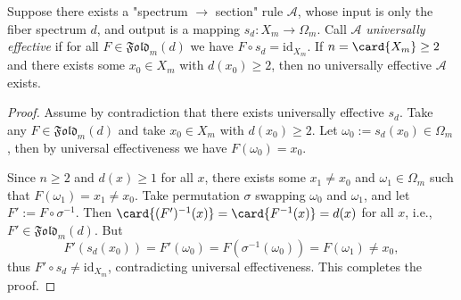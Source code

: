 \begin{theorem}\label{thm:pom-spectrum-cannot-induce-universal-section}
Suppose there exists a "spectrum \(\to\) section" rule \(\mathcal{A}\), whose input is only the fiber spectrum \(d\), and output is a mapping \(s_d:X_m\to\Omega_m\).
Call \(\mathcal{A}\) \emph{universally effective} if for all \(F\in\mathfrak{Fold}_m(d)\) we have \(F\circ s_d=\mathrm{id}_{X_m}\).
If \(n=\card{X_m}\ge 2\) and there exists some \(x_0\in X_m\) with \(d(x_0)\ge 2\), then no universally effective \(\mathcal{A}\) exists.
\end{theorem}
\begin{proof}
Assume by contradiction that there exists universally effective \(s_d\).
Take any \(F\in\mathfrak{Fold}_m(d)\) and take \(x_0\in X_m\) with \(d(x_0)\ge 2\).
Let \(\omega_0:=s_d(x_0)\in\Omega_m\), then by universal effectiveness we have \(F(\omega_0)=x_0\).
\par
Since \(n\ge 2\) and \(d(x)\ge 1\) for all \(x\), there exists some \(x_1\neq x_0\) and \(\omega_1\in\Omega_m\) such that \(F(\omega_1)=x_1\neq x_0\).
Take permutation \(\sigma\) swapping \(\omega_0\) and \(\omega_1\), and let \(F':=F\circ\sigma^{-1}\).
Then \(\card{(F')^{-1}(x)}=\card{F^{-1}(x)}=d(x)\) for all \(x\), i.e., \(F'\in\mathfrak{Fold}_m(d)\).
But
\[
F'(s_d(x_0))=F'(\omega_0)=F(\sigma^{-1}(\omega_0))=F(\omega_1)\neq x_0,
\]
thus \(F'\circ s_d\neq \mathrm{id}_{X_m}\), contradicting universal effectiveness. This completes the proof.
\end{proof}

